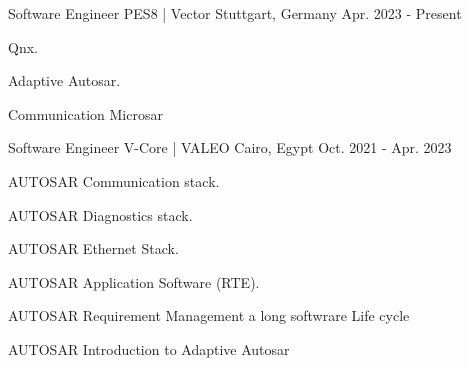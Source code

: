 

\begin{cventries}

  \cventry
    {\normalsize Software Engineer} %
    {\Large PES8 | Vector} %
    {\normalsize Stuttgart, Germany} %
    {\normalsize Apr. 2023 - Present} %
    {
      \begin{cvitems} %
        \item {\normalsize Qnx.}
        \item {\normalsize Adaptive Autosar.}
        \item {\normalsize Communication Microsar}
      \end{cvitems}
    }
  \cventry
    {\normalsize Software Engineer} %
    {\Large V-Core | VALEO} %
    {\normalsize Cairo, Egypt} %
    {\normalsize Oct. 2021 - Apr. 2023} %
    {
      \begin{cvitems} %
        \item {\normalsize AUTOSAR Communication stack.}
        \item {\normalsize AUTOSAR Diagnostics stack.}
        \item {\normalsize AUTOSAR Ethernet Stack.}
        \item {\normalsize AUTOSAR Application Software (RTE).}
        \item {\normalsize AUTOSAR Requirement Management a long softwrare Life cycle}
        \item {\normalsize AUTOSAR Introduction to Adaptive Autosar}
      \end{cvitems}
    }
\end{cventries}
